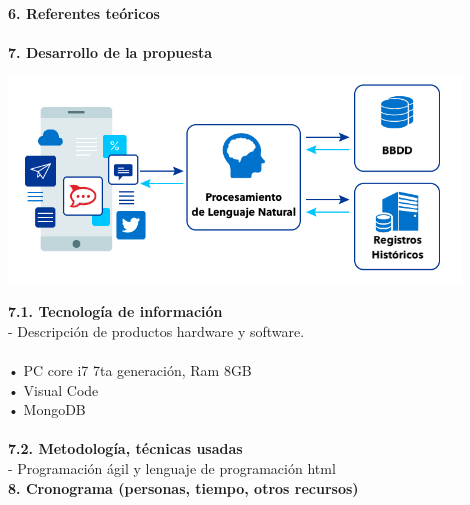 \begin{flushleft}
\begin{itemize}
\textbf{ }\\

\textbf{6.      Referentes teóricos}\\
\textbf{ }\\
\textbf{7.      Desarrollo de la propuesta}\\

\begin{center}
	\includegraphics[width=12cm]{./Imagenes/nlp} 
	\end{center}
\textbf{7.1.   Tecnología de información}\\
-	Descripción de productos hardware y software.\\ 
\textbf{ }\\

•	PC core i7 7ta generación, Ram 8GB \\
•	Visual Code\\
•	MongoDB\\
\textbf{ }\\
\textbf{7.2.   Metodología, técnicas usadas }\\
-	Programación ágil y lenguaje de programación html
\textbf{ }\\
\textbf{8.      Cronograma (personas, tiempo, otros recursos) }\\
\textbf{ }\\


\end{itemize}
\end{flushleft}
